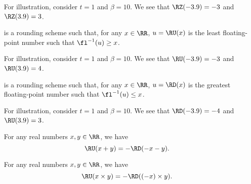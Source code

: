 \begin{ex}
  For illustration, consider $t=1$ and $\beta=10$.
  We see that $\RZ(-3.9)=-3$ and $\RZ(3.9)=3$.
\end{ex}

\begin{defn}
   is a rounding scheme such that, for any $x\in\RR$,
  $u=\RU(x)$ is the least floating-point number such that
  $\fl^{-1}(u)\geq x$.
\end{defn}

\begin{ex}
  For illustration, consider $t=1$ and $\beta=10$.
  We see that $\RU(-3.9)=-3$ and $\RU(3.9)=4$.
\end{ex}

\begin{defn}
   is a rounding scheme such that, for any $x\in\RR$,
  $u=\RD(x)$ is the greatest floating-point number such that
  $\fl^{-1}(u)\leq x$.
\end{defn}

\begin{ex}
  For illustration, consider $t=1$ and $\beta=10$.
  We see that $\RD(-3.9)=-4$ and $\RU(3.9)=3$.
\end{ex}

\begin{thm}
  For any real numbers $x,y\in\RR$, we have
  \begin{equation*}
    \RU(x+y)=-\RD(-x-y).
  \end{equation*}
\end{thm}

\begin{thm}
  For any real numbers $x,y\in\RR$, we have
  \begin{equation*}
    \RU(x\times y)=-\RD((-x)\times y).
  \end{equation*}
\end{thm}

